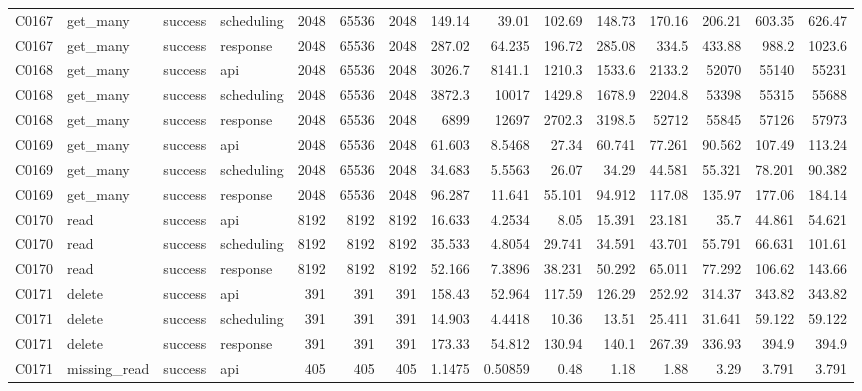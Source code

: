 \begin{landscape}
\begin{longtable}{llllrrrrrrrrrrr}
C0167 & get\_\allowbreak{}many & success & scheduling & 2048 & 65536 & 2048 & 149.14 & 39.01 & 102.69 & 148.73 & 170.16 & 206.21 & 603.35 & 626.47\\
C0167 & get\_\allowbreak{}many & success & response & 2048 & 65536 & 2048 & 287.02 & 64.235 & 196.72 & 285.08 & 334.5 & 433.88 & 988.2 & 1023.6\\
C0168 & get\_\allowbreak{}many & success & api & 2048 & 65536 & 2048 & 3026.7 & 8141.1 & 1210.3 & 1533.6 & 2133.2 & 52070 & 55140 & 55231\\
C0168 & get\_\allowbreak{}many & success & scheduling & 2048 & 65536 & 2048 & 3872.3 & 10017 & 1429.8 & 1678.9 & 2204.8 & 53398 & 55315 & 55688\\
C0168 & get\_\allowbreak{}many & success & response & 2048 & 65536 & 2048 & 6899 & 12697 & 2702.3 & 3198.5 & 52712 & 55845 & 57126 & 57973\\
C0169 & get\_\allowbreak{}many & success & api & 2048 & 65536 & 2048 & 61.603 & 8.5468 & 27.34 & 60.741 & 77.261 & 90.562 & 107.49 & 113.24\\
C0169 & get\_\allowbreak{}many & success & scheduling & 2048 & 65536 & 2048 & 34.683 & 5.5563 & 26.07 & 34.29 & 44.581 & 55.321 & 78.201 & 90.382\\
C0169 & get\_\allowbreak{}many & success & response & 2048 & 65536 & 2048 & 96.287 & 11.641 & 55.101 & 94.912 & 117.08 & 135.97 & 177.06 & 184.14\\
C0170 & read & success & api & 8192 & 8192 & 8192 & 16.633 & 4.2534 & 8.05 & 15.391 & 23.181 & 35.7 & 44.861 & 54.621\\
C0170 & read & success & scheduling & 8192 & 8192 & 8192 & 35.533 & 4.8054 & 29.741 & 34.591 & 43.701 & 55.791 & 66.631 & 101.61\\
C0170 & read & success & response & 8192 & 8192 & 8192 & 52.166 & 7.3896 & 38.231 & 50.292 & 65.011 & 77.292 & 106.62 & 143.66\\
C0171 & delete & success & api & 391 & 391 & 391 & 158.43 & 52.964 & 117.59 & 126.29 & 252.92 & 314.37 & 343.82 & 343.82\\
C0171 & delete & success & scheduling & 391 & 391 & 391 & 14.903 & 4.4418 & 10.36 & 13.51 & 25.411 & 31.641 & 59.122 & 59.122\\
C0171 & delete & success & response & 391 & 391 & 391 & 173.33 & 54.812 & 130.94 & 140.1 & 267.39 & 336.93 & 394.9 & 394.9\\
C0171 & missing\_\allowbreak{}read & success & api & 405 & 405 & 405 & 1.1475 & 0.50859 & 0.48 & 1.18 & 1.88 & 3.29 & 3.791 & 3.791\\

\end{longtable}
\end{landscape}
